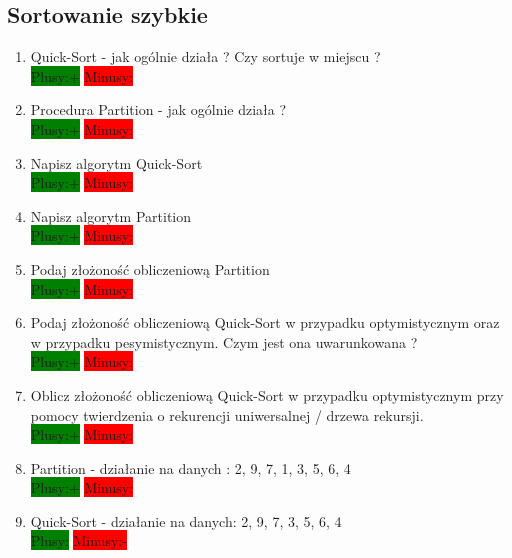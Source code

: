 \documentclass[a4paper,11pt]{article}
\begin{document}
\subsection{Sortowanie szybkie}
\begin{enumerate}
\item Quick-Sort - jak ogólnie działa ? Czy sortuje w miejscu ? \\ \colorbox{green}{Plusy:+} \colorbox{red}{Minusy: }

\item Procedura Partition - jak ogólnie działa ? \\ 
\colorbox{green}{Plusy:+} \colorbox{red}{Minusy: }

\item Napisz algorytm Quick-Sort  \\ 
\colorbox{green}{Plusy:+} \colorbox{red}{Minusy: }

\item Napisz algorytm Partition  \\ 
\colorbox{green}{Plusy:+} \colorbox{red}{Minusy: }

\item Podaj złożoność obliczeniową Partition  \\
\colorbox{green}{Plusy:+} \colorbox{red}{Minusy: }
 
\item Podaj złożoność obliczeniową Quick-Sort w przypadku optymistycznym oraz w przypadku pesymistycznym. Czym jest ona uwarunkowana ?  \\ 
\colorbox{green}{Plusy:+} \colorbox{red}{Minusy: }

\item Oblicz złożoność obliczeniową Quick-Sort w przypadku optymistycznym przy pomocy twierdzenia o rekurencji uniwersalnej / drzewa rekursji.  \\ 
\colorbox{green}{Plusy:+} \colorbox{red}{Minusy: }

\item Partition - działanie na danych : 2, 9, 7, 1, 3, 5, 6, 4
\\ 
\colorbox{green}{Plusy:+} \colorbox{red}{Minusy: }

\item Quick-Sort - działanie na danych: 2, 9, 7, 3, 5, 6, 4
\\ \colorbox{green}{Plusy:} \colorbox{red}{Minusy:- }

\end{enumerate}
\end{document}
